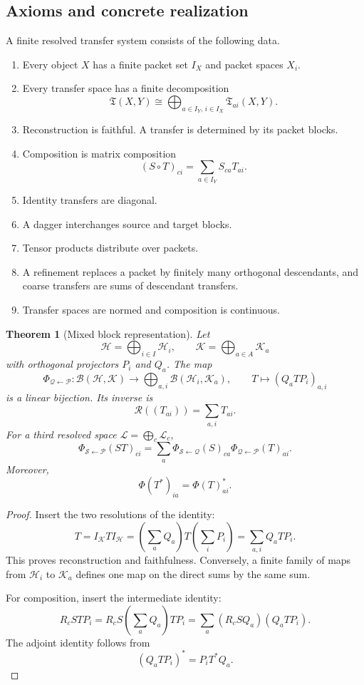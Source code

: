 \documentclass{aomart}
\newtheorem{theorem}{Theorem}[section]
\theoremstyle{definition}
\theoremstyle{remark}
\newcommand{\B}{\mathcal B}
\newcommand{\K}{\mathcal K}
\newcommand{\Hh}{\mathcal H}
\newcommand{\Tcal}{\mathfrak T}
\newcommand{\Rcal}{\mathcal R}
\newcommand{\Lcal}{\mathcal L}
\newcommand{\Pcal}{\mathcal P}
\newcommand{\Qcal}{\mathcal Q}
\begin{document}
\subsection{Axioms and concrete realization}

\begin{definition}\label{def:finite_resolved_system}
A finite resolved transfer system consists of the following data.
\begin{enumerate}[label=\textup{(R\arabic*)}]
\item Every object \(X\) has a finite packet set \(I_X\) and packet spaces \(X_i\).
\item Every transfer space has a finite decomposition
\[
 \Tcal(X,Y)
 \cong
 \bigoplus_{a\in I_Y,\,i\in I_X}
 \Tcal_{ai}(X,Y).
\]
\item Reconstruction is faithful. A transfer is determined by its packet blocks.
\item Composition is matrix composition
\[
 (S\circ T)_{ci}
 =
 \sum_{a\in I_Y}S_{ca}T_{ai}.
\]
\item Identity transfers are diagonal.
\item A dagger interchanges source and target blocks.
\item Tensor products distribute over packets.
\item A refinement replaces a packet by finitely many orthogonal descendants, and coarse transfers are sums of descendant transfers.
\item Transfer spaces are normed and composition is continuous.
\end{enumerate}
\end{definition}

\begin{theorem}[Mixed block representation]\label{thm:mixed_blocks}
Let
\[
 \Hh=\bigoplus_{i\in I}\Hh_i,
 \qquad
 \K=\bigoplus_{a\in A}\K_a
\]
with orthogonal projectors \(P_i\) and \(Q_a\). The map
\[
 \Phi_{\Qcal\leftarrow\Pcal}:
 \B(\Hh,\K)
 \longrightarrow
 \bigoplus_{a,i}\B(\Hh_i,\K_a),
 \qquad
 T\longmapsto(Q_aTP_i)_{a,i}
\]
is a linear bijection. Its inverse is
\[
 \Rcal((T_{ai}))=\sum_{a,i}T_{ai}.
\]
For a third resolved space \(\Lcal=\bigoplus_c\Lcal_c\),
\[
 \Phi_{\mathcal S\leftarrow\Pcal}(ST)_{ci}
 =
 \sum_a
 \Phi_{\mathcal S\leftarrow\Qcal}(S)_{ca}
 \Phi_{\Qcal\leftarrow\Pcal}(T)_{ai}.
\]
Moreover,
\[
 \Phi(T^*)_{ia}
 =
 \Phi(T)_{ai}^*.
\]
\end{theorem}

\begin{proof}
Insert the two resolutions of the identity:
\[
 T
 =
 I_{\K}TI_{\Hh}
 =
 \left(\sum_aQ_a\right)
 T
 \left(\sum_iP_i\right)
 =
 \sum_{a,i}Q_aTP_i.
\]
This proves reconstruction and faithfulness. Conversely, a finite family of maps from \(\Hh_i\) to \(\K_a\) defines one map on the direct sums by the same sum.

For composition, insert the intermediate identity:
\[
 R_cSTP_i
 =
 R_cS\left(\sum_aQ_a\right)TP_i
 =
 \sum_a(R_cSQ_a)(Q_aTP_i).
\]
The adjoint identity follows from
\[
 (Q_aTP_i)^*=P_iT^*Q_a.
\]
\end{proof}
\end{document}
